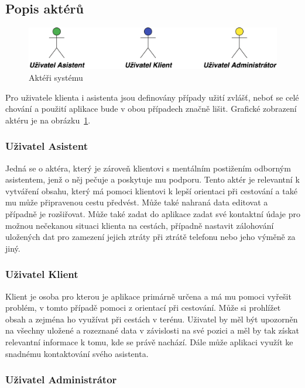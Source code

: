 \documentclass{article}
\begin{document}
\subsection{Popis aktérů}
\begin{figure}[H]
        \centering
                \includegraphics[scale=0.14]{img/actors.png}
        \caption{Aktéři systému}
        \label{fig:actors}
\end{figure}

Pro uživatele klienta i asistenta jsou definovány případy užití zvlášť, neboť se celé chování
a použití aplikace bude v obou případech značně lišit. Grafické zobrazení aktéru je na obrázku~\ref{fig:actors}.

\subsubsection{Uživatel Asistent}
Jedná se o aktéra, který je zároveň klientovi s mentálním postižením odborným asistentem,
jenž o něj pečuje a poskytuje mu podporu. Tento aktér je relevantní k vytváření obsahu,
který má pomoci klientovi k lepší orientaci při cestování a také mu může připravenou
cestu předvést. Může také nahraná data editovat a případně je rozšiřovat. Může také zadat
do aplikace zadat své kontaktní údaje pro možnou nečekanou situaci klienta na cestách, případně
nastavit zálohování uložených dat pro zamezení jejich ztráty při ztrátě telefonu nebo jeho výměně
za jiný.

\subsubsection{Uživatel Klient}
Klient je osoba pro kterou je aplikace primárně určena a má mu pomoci vyřešit problém,
v tomto případě pomoci z orientací při cestování. Může si prohlížet obsah a zejména ho
využívat při cestách v terénu. Uživatel by měl být upozorněn na všechny uložené a rozeznané
data v závislosti na své pozici a měl by tak získat relevantní informace k tomu, kde se právě
nachází. Dále může aplikaci využít ke snadnému kontaktování svého asistenta.



\subsubsection{Uživatel Administrátor}
\end{document}
